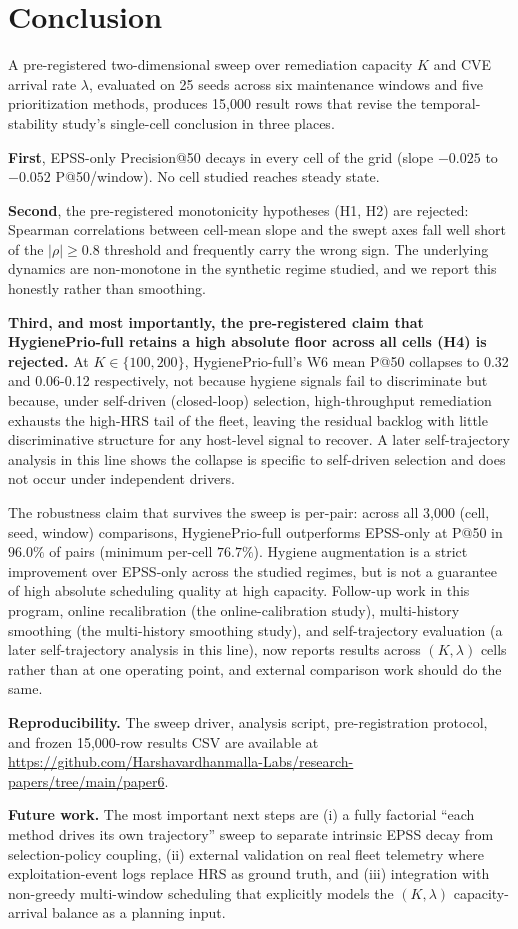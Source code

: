 \section{Conclusion}
\label{sec:conclusion}

A pre-registered two-dimensional sweep over remediation capacity $K$
and CVE arrival rate $\lambda$, evaluated on 25 seeds across six
maintenance windows and five prioritization methods, produces 15{,}000
result rows that revise the temporal-stability study's single-cell conclusion in three
places.

\textbf{First}, EPSS-only Precision@50 decays in every cell of the
grid (slope $-0.025$ to $-0.052$ P@50/window). No cell studied
reaches steady state.

\textbf{Second}, the pre-registered monotonicity hypotheses (H1, H2)
are rejected: Spearman correlations between cell-mean slope and the
swept axes fall well short of the $|\rho| \geq 0.8$ threshold and
frequently carry the wrong sign. The underlying dynamics are
non-monotone in the synthetic regime studied, and we report this honestly
rather than smoothing.

\textbf{Third, and most importantly, the pre-registered claim that
HygienePrio-full retains a high absolute floor across all cells (H4)
is rejected.} At $K \in \{100, 200\}$, HygienePrio-full's W6 mean
P@50 collapses to 0.32 and 0.06-0.12 respectively, not because
hygiene signals fail to discriminate but because, under self-driven
(closed-loop) selection, high-throughput remediation exhausts the
high-HRS tail of the fleet, leaving the residual backlog with little
discriminative structure for any host-level signal to recover.
A later self-trajectory analysis in this line shows the collapse is specific to
self-driven selection and does not occur under independent drivers.

The robustness claim that survives the sweep is per-pair: across all
3{,}000 (cell, seed, window) comparisons, HygienePrio-full outperforms
EPSS-only at P@50 in $96.0\%$ of pairs (minimum per-cell $76.7\%$).
Hygiene augmentation is a strict improvement over EPSS-only across
the studied regimes, but is not a guarantee of high absolute scheduling
quality at high capacity. Follow-up work in this program, online
recalibration (the online-calibration study), multi-history smoothing (the multi-history smoothing study), and
self-trajectory evaluation (a later self-trajectory analysis in this line), now
reports results across $(K, \lambda)$ cells rather than at one
operating point, and external comparison work should do the same.

\textbf{Reproducibility.} The sweep driver, analysis script, pre-registration
protocol, and frozen 15{,}000-row results CSV are available at
\url{https://github.com/Harshavardhanmalla-Labs/research-papers/tree/main/paper6}.

\textbf{Future work.} The most important next steps are (i) a fully
factorial ``each method drives its own trajectory'' sweep to separate
intrinsic EPSS decay from selection-policy coupling, (ii) external
validation on real fleet telemetry where exploitation-event logs
replace HRS as ground truth, and (iii) integration with non-greedy
multi-window scheduling that explicitly models the $(K, \lambda)$
capacity-arrival balance as a planning input.
